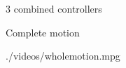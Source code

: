 \begin{frame}{3 combined controllers}
\begin{minipage}{0.40\textwidth}
  \end{minipage}
%
\end{frame}

%
%

\begin{frame}{Complete motion}
  \begin{center}
    {./videos/wholemotion.mpg}
  \end{center}
\end{frame}